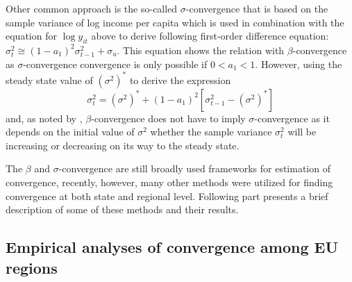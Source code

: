 \documentclass[11pt]{article}
\begin{document}
Other common approach is the so-called $\sigma$-convergence that is based on the sample variance of log income per capita which is used in combination with the equation for $\log y_{it}$ above to derive following first-order difference equation:
 \(
\sigma_{t}^{2} \cong (1-a_{1})^2\sigma_{t-1}^{2} + \sigma_{u}\).
This equation shows the relation with $\beta$-convergence as $\sigma$-convergence convergence is only possible if \(0 < a_{1} < 1\). However, using the steady state value of $(\sigma^{2})^{*}$ to derive the expression \begin{equation} \label{eq2}\sigma_{t}^{2} = (\sigma^{2})^{*} + (1-a_{1})^2[\sigma_{t-1}^{2} - (\sigma^{2})^{*}] \end{equation}
and, as noted by \citet{sala1996regional},  $\beta$-convergence does not have to imply $\sigma$-convergence as it depends on the initial value of $\sigma^{2}$ whether the sample variance  $\sigma_{t}^{2}$ will be increasing or decreasing on its way to the steady state.

The $\beta$ and $\sigma$-convergence are still broadly used frameworks for estimation of convergence, recently, however, many other methods were utilized for finding convergence at both state and regional level. Following part presents a brief description of some of these methods and their results.
  
 \subsection{Empirical analyses of convergence among EU regions}
\end{document}
